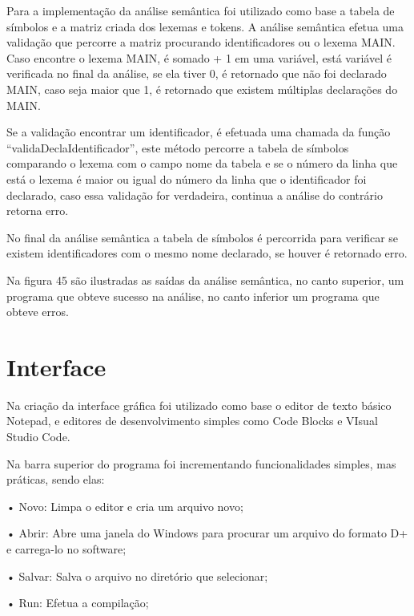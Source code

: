 \documentclass[12pt,oneside,a4paper,chapter=TITLE,section=TITLE,sumario=tradicional]{abntex2}
\begin{document}
Para a implementação da análise semântica foi utilizado como base a tabela de símbolos e a matriz criada dos lexemas e tokens. A análise semântica efetua uma validação que percorre a matriz procurando identificadores ou o lexema MAIN. Caso encontre o lexema MAIN, é somado + 1 em uma variável, está variável é verificada no final da análise, se ela tiver 0, é retornado que não foi declarado MAIN, caso seja maior que 1, é retornado que existem múltiplas declarações do MAIN.

Se a validação encontrar um identificador, é efetuada uma chamada da função “validaDeclaIdentificador”, este método percorre a tabela de símbolos comparando o lexema com o campo nome da tabela e se o número da linha que está o lexema é maior ou igual do número da linha que o identificador foi declarado, caso essa validação for verdadeira, continua a análise do contrário retorna erro. 

No final da análise semântica a tabela de símbolos é percorrida para verificar se existem identificadores com o mesmo nome declarado, se houver é retornado erro.

Na figura 45 são ilustradas as saídas da análise semântica, no canto superior, um programa que obteve sucesso na análise, no canto inferior um programa que obteve erros.

\begin{figure}[htb]
\end{figure} 

\section{Interface}
\label{sec:interface}

Na criação da interface gráfica foi utilizado como base o editor de texto básico Notepad, e editores de desenvolvimento simples como Code Blocks e VIsual Studio Code. 

Na barra superior do programa foi incrementando funcionalidades simples, mas práticas, sendo elas:

•	Novo: Limpa o editor e cria um arquivo novo;

•	Abrir: Abre uma janela do Windows para procurar um arquivo do formato D+ e carrega-lo no software;

•	Salvar: Salva o arquivo no diretório que selecionar;

•	Run: Efetua a compilação;
\end{document}
